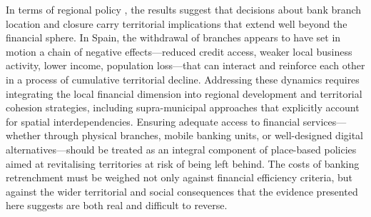 \documentclass[a4paper,11pt,oneside]{article}
\begin{document}
{In terms of regional policy \citep{fratesi2023regional}, the results suggest that decisions about bank branch location and closure carry territorial implications that extend well beyond the financial sphere. In Spain, the withdrawal of branches appears to have set in motion a chain of negative effects---reduced credit access, weaker local business activity, lower income, population loss---that can interact and reinforce each other in a process of cumulative territorial decline. Addressing these dynamics requires integrating the local financial dimension into regional development and territorial cohesion strategies, including supra-municipal approaches that explicitly account for spatial interdependencies. Ensuring adequate access to financial services---whether through physical branches, mobile banking units, or well-designed digital alternatives---should be treated as an integral component of place-based policies aimed at revitalising territories at risk of being left behind. The costs of banking retrenchment must be weighed not only against financial efficiency criteria, but against the wider territorial and social consequences that the evidence presented here suggests are both real and difficult to reverse.




\color{black}


\pagebreak
\clearpage


{\small


}

\pagebreak
\clearpage










}
\end{document}
